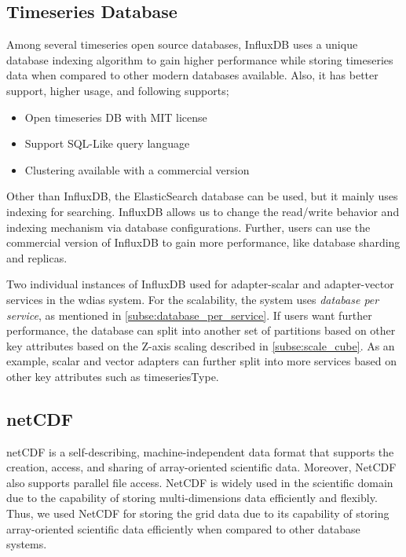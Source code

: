 \subsection{Timeseries Database}
\label{subse:influxdb}

Among several timeseries open source databases, InfluxDB \cite{influxdbInfluxDBDocumentation} uses a unique database indexing algorithm to gain higher performance while storing timeseries data when compared to other modern databases available. Also, it has better support, higher usage, and following supports;

\begin{itemize}
  \item Open timeseries DB with MIT license
  \item Support SQL-Like query language
  \item Clustering available with a commercial version
\end{itemize}

Other than InfluxDB, the ElasticSearch database can be used, but it mainly uses indexing for searching. InfluxDB allows us to change the read/write behavior and indexing mechanism via database configurations. Further, users can use the commercial version of InfluxDB to gain more performance, like database sharding and replicas.

Two individual instances of InfluxDB used for adapter-scalar and adapter-vector services in the \acrshort{wdias} system. For the scalability, the system uses \emph{database per service}, as mentioned in \cref{subse:database_per_service}. If users want further performance, the database can split into another set of partitions based on other key attributes based on the Z-axis scaling described in \cref{subse:scale_cube}. As an example, scalar and vector adapters can further split into more services based on other key attributes such as timeseriesType.

\subsection{\acrfull{netCDF}}
\label{subse:netcdf}

\acrshort{netCDF} \cite{unidataUnidataNetCDF} is a self-describing, machine-independent data format that supports the creation, access, and sharing of array-oriented scientific data. Moreover, NetCDF also supports parallel file access. NetCDF is widely used in the scientific domain due to the capability of storing multi-dimensions data efficiently and flexibly. Thus, we used NetCDF for storing the grid data due to its capability of storing array-oriented scientific data efficiently when compared to other database systems.

